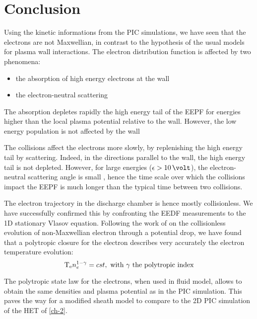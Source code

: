 
\section{Conclusion }
\label{sec-ch3conclusion}

Using the kinetic informations from the \ac{PIC} simulations, we have seen that the electrons are not Maxwellian, in contrast to the hypothesis of the usual models for plasma wall interactions.
The electron distribution function is affected by two phenomena\string:
\begin{itemize}
  \item the absorption of high energy electrons at the wall
  \item the electron-neutral scattering
\end{itemize}
\vspace{1em}
The absorption depletes rapidly the high energy tail of the EEPF for energies higher than the local plasma potential relative to the wall.
However, the low energy population is not affected by the wall

The collisions affect the electrons more slowly, by replenishing the high energy tail by scattering.
Indeed, in the directions parallel to the wall, the high energy tail is not depleted.
However, for large energies ($\ek > 10\,\volt$), the electron-neutral scattering angle is small \citep{vahedi1995}, hence the time scale over which the collisions impact the EEPF is much longer than the typical time between two collisions.

The electron trajectory in the discharge chamber is hence mostly collisionless.
We have successfully confirmed this by confronting the EEDF measurements to the 1D stationary Vlasov equation.
Following the work of \citet{zhang2016} on the collisionless evolution of non-Maxwellian electron through a potential drop, we have found that a polytropic closure for the electron describes very accurately the electron temperature evolution\string:
\begin{equation*} \label{eq-polyp2}
  \mathrm{T_e} n_e^{1-\gamma} = cst, \text{ with $\gamma$ the polytropic index}
\end{equation*}

The polytropic state law for the electrons, when used in fluid model, allows to obtain the same densities and plasma potential as in the \ac{PIC} simulation.
This paves the way for a modified sheath model to compare to the \ac{2D} \ac{PIC} simulation of the \ac{HET} of \cref{ch-2}.

